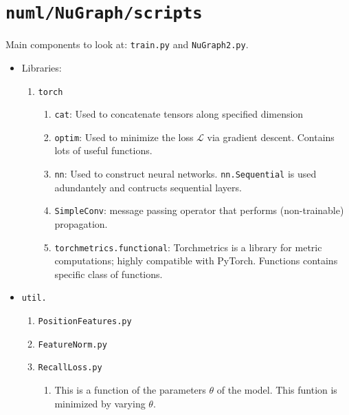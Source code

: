 \section{\texttt{numl/NuGraph/scripts}}

Main components to look at: \texttt{train.py} and \texttt{NuGraph2.py}.

\begin{itemize}
    \item Libraries:
        \begin{enumerate}
            \item \texttt{torch}
                \begin{enumerate}
                    \item \texttt{cat}: Used to concatenate tensors along specified dimension
                    \item \texttt{optim}: Used to minimize the loss $\mathcal{L}$ via gradient descent. Contains lots of useful functions.
                    \item \texttt{nn}: Used to construct neural networks. \texttt{nn.Sequential} is used adundantely and contructs sequential layers.

                    \item \texttt{SimpleConv}: message passing operator that performs (non-trainable) propagation.
                    
                    \item \texttt{torchmetrics.functional}: Torchmetrics is a library for metric computations; highly compatible with PyTorch. Functions contains specific class of functions.
                \end{enumerate}
        \end{enumerate}
        
    \item \texttt{util.}
    \begin{enumerate}
        \item \texttt{PositionFeatures.py}

        \item \texttt{FeatureNorm.py}

        \item \texttt{RecallLoss.py}
            \begin{enumerate}
                \item This is a function of the parameters $\theta$ of the model. This funtion is minimized by varying $\theta$.
                

\end{enumerate}
\end{enumerate}
\end{itemize}
